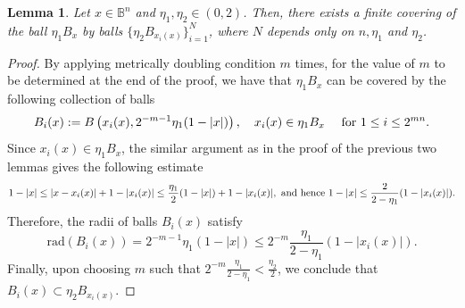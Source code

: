 \documentclass[11pt,a4paper,reqno]{amsart}
\newtheorem{lem}[theorem]{Lemma}
\theoremstyle{definition}
\newtheorem{remark}[theorem]{Remark}
\renewcommand{\a}{\operatorname{a}}
\newcommand{\B}{\mathbb{B}^n}
\numberwithin{komcounter}{section}
\begin{document}
\begin{lem}\label{lem:cover-aux}
Let $x\in\B$ and $\eta_1,\eta_2 \in (0,2)$. Then, there exists a finite covering of the ball $\eta_1B_x$ by balls $\{ \eta_2 B_{x_i(x)}\}_{i=1}^N$, where $N$ depends only on $n,\eta_1$ and $\eta_2$.
\end{lem}
\begin{proof}
By applying metrically doubling condition $m$ times, for the value of $m$ to be determined at the end of the proof, we have that $\eta_1 B_x$ can be covered by the following collection of 
balls
$$
  B_i(x):=B\left(x_i(x),2^{-m-1}\eta_1(1-|x|)\right),\quad x_i(x)\in \eta_1 B_x\quad \hbox{ for } 1\leq i\leq 2^{mn}.
$$
Since $x_i(x)\in \eta_1B_x$, the similar argument as in the proof of the previous two lemmas gives the following estimate
$$
 1-|x|\leq |x-x_i(x)|+1-|x_i(x)|\leq \frac{\eta_1}{2} (1-|x|)+1-|x_i(x)|,\hbox{ and hence }1-|x|\leq \frac{2}{2-\eta_1}(1-|x_i(x)|).
$$
Therefore, the radii of balls $B_i(x)$ satisfy
$$
\mathrm{rad} (B_i(x))=2^{-m-1}\eta_1(1-|x|)\leq 2^{-m}\frac{\eta_1}{2-\eta_1}(1-|x_i(x)|).
$$
Finally, upon choosing $m$ such that $2^{-m}\frac{\eta_1}{2-\eta_1}<\frac{\eta_2}{2}$, we conclude that $B_i(x)\subset \eta_2 B_{x_i(x)}$. 
\end{proof}

\end{document}
